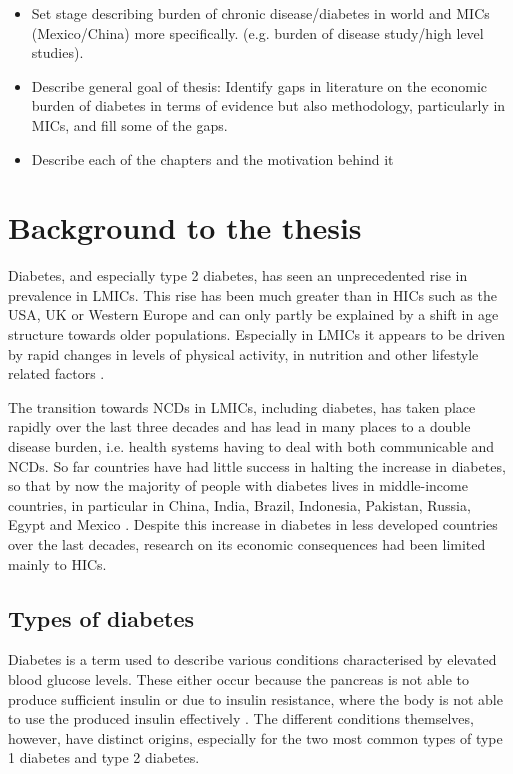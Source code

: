 
\begin{itemize}

\item Set stage describing burden of chronic disease/diabetes in world and MICs (Mexico/China) more specifically.  (e.g. burden of disease study/high level studies).
\item Describe general goal of thesis:
\subitem Identify gaps in literature on the economic burden of diabetes in terms of evidence but also methodology, particularly in MICs, and fill some of the gaps.
\item Describe each of the chapters and the motivation behind it
\subitem 
\end{itemize}

\section{Background to the thesis}

Diabetes, and especially type 2 diabetes, has seen an unprecedented rise in prevalence in \acp{LMIC}. This rise has been much greater than in \acp{HIC} such as the USA, UK or Western Europe and can only partly be explained by a shift in age structure towards older populations. Especially in \acp{LMIC} it appears to be driven by rapid changes in levels of physical activity, in nutrition and other lifestyle related factors  \parencite{Risk2016,Hu2011}.

The transition towards \acp{NCD} in \acp{LMIC}, including diabetes, has taken place rapidly over the last three decades and has lead in many places to a double disease burden, i.e. health systems having to deal with both communicable and \acp{NCD}. So far countries have had little success in halting the increase in diabetes, so that by now the majority of people with diabetes lives in middle-income countries, in particular in China, India, Brazil, Indonesia, Pakistan, Russia, Egypt and Mexico \parencite{Risk2016}. Despite this increase in diabetes in less developed countries over the last decades, research on its economic consequences had been limited mainly to \acp{HIC}.

 
\subsection{Types of diabetes}

Diabetes is a term used to describe various conditions characterised by elevated blood glucose levels. These either occur because the pancreas is not able to produce sufficient insulin or due to insulin resistance, where the body is not able to use the produced insulin effectively \parencite{WorldHealthOrganization2016}. The different conditions themselves, however, have distinct origins, especially for the two most common types of type 1 diabetes and type 2 diabetes. 

